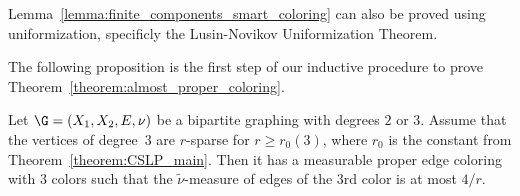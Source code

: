 \begin{rema*}
Lemma~\ref{lemma:finite_components_smart_coloring} can also be proved using uniformization, specificly the Lusin-Novikov Uniformization Theorem.
\end{rema*}


The following proposition is the first step of our inductive procedure to prove Theorem~\ref{theorem:almost_proper_coloring}.

\begin{prop}\label{proposition:induction_start}
Let $\G=(X_1,X_2,E, \nu)$ be a bipartite graphing with degrees $2$ or $3$. Assume that the vertices of degree~$3$ are $r$-sparse for $r \geq r_0(3)$, where $r_0$ is the constant from Theorem~\ref{theorem:CSLP_main}. Then it has a measurable proper edge coloring with 3 colors such that the $\widetilde{\nu}$-measure of edges of the 3rd color is at most $4/r$.
\end{prop}

